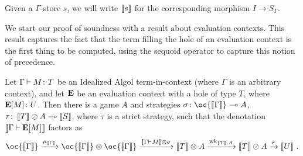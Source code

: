 \documentclass[11pt]{report}
\begin{document}
Given a $\Gamma$-store $s$, we will write $\left\llbracket s\right\rrbracket$ for the corresponding morphism $I \to S_\Gamma$.

We start our proof of soundness with a result about evaluation contexts.
This result captures the fact that the term filling the hole of an evaluation context is the first thing to be computed, using the sequoid operator to capture this notion of precedence.
\begin{lemma}
  Let $\Gamma\mathbin{\vdash} M\colon T$ be an Idealized Algol term-in-context (where $\Gamma$ is an arbitrary context), and let ${\mathbf{E}}$ be an evaluation context with a hole of type $T$, where ${\mathbf{E}}[M]\colon U$.  
  Then there is a game $A$ and strategies $\sigma\from \oc{\deno{\Gamma}} \implies A$, $\tau\colon\left\llbracket T\right\rrbracket\oslash A \multimap \left\llbracket S\right\rrbracket$, where $\tau$ is a strict strategy, such that the denotation $\left\llbracket\Gamma\mathbin{\vdash}{\mathbf{E}}[M]\right\rrbracket$ factors as
  \[
    \oc{\deno{\Gamma}} \xrightarrow{\mu_{{\deno{\Gamma}}}} \oc {\deno{\Gamma}} \tensor \oc {\deno{\Gamma}} \xrightarrow{\deno{\Gamma\ts M}\tensor\sigma} \deno{T}\tensor A \xrightarrow{\wk_{\deno{T},A}} \deno{T} \sequoid A \xrightarrow{\tau} \deno{U}\,.
    \]
  \label{LemEvContexLemma}
\end{lemma}
\end{document}

